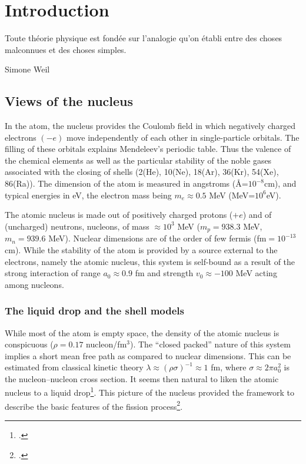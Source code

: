 	\chapter{Introduction}\label{introduction}
	 \epigraph{Toute th\'eorie physique est fond\'ee sur l'analogie qu'on \'etabli entre des choses malconnues et des choses simples.}{Simone Weil}
\section{Views of the nucleus}
In the atom, the nucleus provides the Coulomb field in which negatively charged electrons $(-e)$ move independently of each other in single-particle orbitals. The filling of these orbitals explains Mendeleev's periodic table. Thus the valence of the chemical elements as well as the particular stability of the noble gases associated with the closing of shells (2(He), 10(Ne), 18(Ar), 36(Kr), 54(Xe), 86(Ra)). The dimension of the atom is measured in angstroms (\AA=$10^{-8}$cm), and typical energies in eV, the electron mass being $m_e\approx 0.5$ MeV (MeV=$10^6$eV).


The atomic nucleus is made out of positively charged protons ($+e$) and of (uncharged) neutrons, nucleons, of mass $\approx 10^3$ MeV ($m_p=938.3$ MeV, $m_n=939.6$ MeV). Nuclear dimensions are of the order of few fermis (fm$=10^{-13}$ cm). While the stability of the atom is provided by a source external to the electrons, namely the atomic nucleus, this system is  self-bound as a result of the strong interaction of range $a_0\approx 0.9$ fm and strength $v_0\approx -100$ MeV acting among nucleons. 
\subsection{The liquid drop and the shell models}\label{S1.1.1}
While most of the atom is empty space, the density of the atomic nucleus is conspicuous ($\rho=0.17$ nucleon/fm$^3$). The ``closed packed'' nature of this system implies a short mean free path as compared to nuclear dimensions. This can be estimated from classical kinetic theory $\lambda\approx(\rho\sigma)^{-1}\approx1$ fm, where $\sigma\approx 2\pi a_0^2$ is the nucleon--nucleon cross section. It seems then natural to liken the atomic nucleus to a liquid drop\footnote{\cite{Bohr:37}.}.
This picture of the nucleus provided the framework to describe the basic features of the fission process\footnote{\cite{Meitner:39,Bohr:39}.}. 



